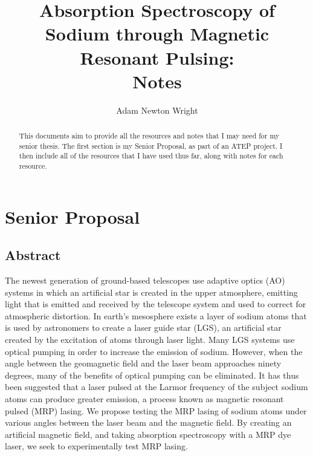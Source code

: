 \documentclass{article}
\title{Absorption Spectroscopy of Sodium through Magnetic Resonant Pulsing:\\
Notes}
\author{Adam Newton Wright}
\begin{document}
\maketitle

\begin{abstract}
  This documents aim to provide all the resources and notes that I may need for my senior thesis. The first section is my Senior Proposal, as part of an ATEP project. I then include all of the resources that I have used thus far, along with notes for each resource.
\end{abstract}

\pagebreak
\tableofcontents


\pagebreak


\pagebreak
\section{Senior Proposal}
\subsection{Abstract}
The newest generation of ground-based telescopes use adaptive optics (AO) systems in which an artificial star is created in the upper atmosphere, emitting light that is emitted and received by the telescope system and used to correct for atmospheric distortion. In earth’s mesosphere exists a layer of sodium atoms that is used by astronomers to create a laser guide star (LGS), an artificial star created by the excitation of atoms through laser light. Many LGS systems use optical pumping in order to increase the emission of sodium. However, when the angle between the geomagnetic field and the laser beam approaches ninety degrees, many of the benefits of optical pumping can be eliminated. It has thus been suggested that a laser pulsed at the Larmor frequency of the subject sodium atoms can produce greater emission, a process known as magnetic resonant pulsed (MRP) lasing. We propose testing the MRP lasing of sodium atoms under various angles between the laser beam and the magnetic field. By creating an artificial magnetic field, and taking absorption spectroscopy with a MRP dye laser, we seek to experimentally test MRP lasing.
\end{document}
